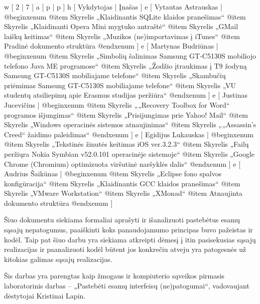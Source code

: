 
\xtable
{
  w [ 2  | 7 ]
  a [ p  | p ]
  h [ Vykdytojas | Įnašas ]
  e [ Vytautas Astrauskas 
  | @begin{xenum} 
      @item Skyrelis „Klaidinantis SQLite klaidos pranešimas“
      @item Skyrelis „Klaidinanti Opera Mini mygtuko antraštė“ 
      @item Skyrelis „GMail laiškų keitimas“
      @item Skyrelis „Muzikos (ne)importavimas į iTunes“
      @item Pradinė dokumento struktūra
    @end{xenum}
  ]
  e [ Martynas Budriūnas
  | @begin{xenum} 
      @item Skyrelis „Simbolių šalinimas Samsung GT-C5130S mobiliojo telefono Java ME programose“
      @item Skyrelis „Žodžio įtraukimas į T9 žodyną Samsung GT-C5130S mobiliajame telefone“
      @item Skyrelis „Skambučių priėmimas Samsung GT-C5130S mobiliajame telefone“
      @item Skyrelis „VU studentų atsiliepimų apie Erasmus studijas peržiūra“
    @end{xenum}
  ]
  e [ Justinas Jucevičius 
  | @begin{xenum} 
      @item Skyrelis „„Recovery Toolbox for Word“ programos išjungimas“
      @item Skyrelis „Prisijungimas prie Yahoo! Mail“
      @item Skyrelis „Windows operacinės sistemos atnaujinimas“
      @item Skyrelis „„Assassin's Creed“ žaidimo paleidimas“
    @end{xenum}
  ]
  e [ Egidijus Lukauskas 
  | @begin{xenum} 
      @item Skyrelis „Tekstinės žinutės keitimas iOS ver.3.2.3“
      @item Skyrelis „Failų peržiųra Nokia Symbian v52.0.101 operacinėje sistemoje“
      @item Skyrelis „Google Chrome (Chromium) optimizuota viršutinė naršyklės dalis“
    @end{xenum}
  ]
  e [ Audrius Šaikūnas 
  | @begin{xenum} 
      @item Skyrelis „Eclipse fono spalvos konfigūracija“
      @item Skyrelis „Klaidinantis GCC klaidos pranešimas“ 
      @item Skyrelis „VMware Workstation“
      @item Skyrelis „XMonad“
      @item Atnaujinta dokumento struktūra
    @end{xenum}
  ]
}

Šiuo dokumentu siekiama formaliai aprašyti ir išanalizuoti
pastebėtus esamų sąsajų nepatogumus, paaiškinti koks panaudojamumo
principas buvo pažeistas ir kodėl. Taip pat šiuo darbu yra siekiama
atkreipti dėmesį į itin pasisekusias sąsajų realizacijas ir
paanalizuoti kodėl būtent jos konkrečiu atveju yra patogesnės už
kitokias galimas sąsajų realizacijas.

Šis darbas yra parengtas kaip žmogaus ir kompiuterio sąveikos pirmasis laboratorinis darbas
– „Pastebėti esamų interfeisų (ne)patogumai“, vadovaujant dėstytojai Kristinai Lapin.
